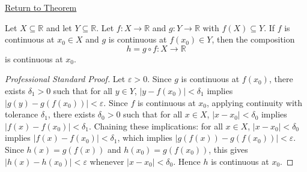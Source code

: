 \newpage
{}
\label{prf:composition-of-continuous-functions}

\begin{remark*}[Return]
\hyperref[thm:composition-of-continuous-functions]{Return to Theorem}
\end{remark*}

\begin{theorem*}
Let $X \subseteq \mathbb{R}$ and let $Y \subseteq \mathbb{R}$.
Let $f : X \to \mathbb{R}$ and $g : Y \to \mathbb{R}$ with $f(X)\subseteq Y$.
If $f$ is continuous at $x_0 \in X$ and $g$ is continuous at $f(x_0)\in Y$,
then the composition
\[
  h = g \circ f : X \to \mathbb{R}
\]
is continuous at $x_0$.
\end{theorem*}

\begin{proof}[Professional Standard Proof]
\LRAProofBodyStart
Let $\varepsilon > 0$. Since $g$ is continuous at $f(x_0)$, there exists $\delta_1 > 0$ such that for all $y \in Y$, $|y - f(x_0)| < \delta_1$ implies $|g(y) - g(f(x_0))| < \varepsilon$. Since $f$ is continuous at $x_0$, applying continuity with tolerance $\delta_1$, there exists $\delta_0 > 0$ such that for all $x \in X$, $|x - x_0| < \delta_0$ implies $|f(x) - f(x_0)| < \delta_1$. Chaining these implications: for all $x \in X$, $|x - x_0| < \delta_0$ implies $|f(x) - f(x_0)| < \delta_1$, which implies $|g(f(x)) - g(f(x_0))| < \varepsilon$. Since $h(x) = g(f(x))$ and $h(x_0) = g(f(x_0))$, this gives $|h(x) - h(x_0)| < \varepsilon$ whenever $|x - x_0| < \delta_0$. Hence $h$ is continuous at $x_0$.
\end{proof}

